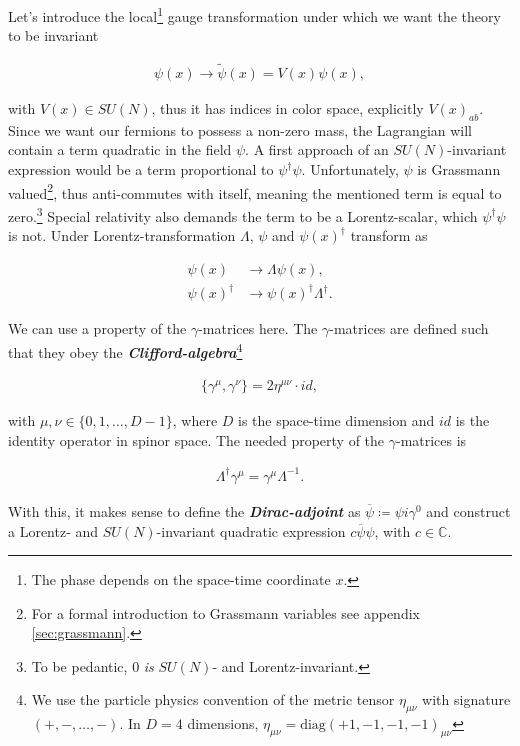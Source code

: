 \documentclass{article}
\theoremstyle{plain} %
\theoremstyle{convention} %
\theoremstyle{remark} %
\def\df#1{\textbf{\textit{#1}}}
\numberwithin{equation}{section}
\begin{document}
Let's introduce the local\footnote{The phase depends on the space-time coordinate $x$.} gauge transformation under which we want the theory to be invariant

\begin{align*}
    \psi(x) \longrightarrow \tilde{\psi}(x) = V(x) \psi(x),
\end{align*}

with $V(x) \in SU(N)$, thus it has indices in color space, explicitly $V(x)_{ab}$. Since we want our fermions to possess a non-zero mass, the Lagrangian will contain a term quadratic in the field $\psi$. A first approach of an $SU(N)$-invariant expression would be a term proportional to $\psi^{\dagger} \psi$. Unfortunately, $\psi$ is Grassmann valued\footnote{For a formal introduction to Grassmann variables see appendix \ref{sec:grassmann}.}, thus anti-commutes with itself, meaning the mentioned term is equal to zero.\footnote{To be pedantic, $0$ \textit{is} $SU(N)$- and Lorentz-invariant.} Special relativity also demands the term to be a Lorentz-scalar, which $\psi^{\dagger} \psi$ is not. Under Lorentz-transformation $\Lambda$, $\psi$ and $\psi(x)^{\dagger}$ transform as

\begin{align*}
    \psi(x) &\longrightarrow \Lambda \psi(x), \\
    \psi(x)^{\dagger} &\longrightarrow \psi(x)^{\dagger} \Lambda^{\dagger}.
\end{align*}

We can use a property of the $\gamma$-matrices here. The $\gamma$-matrices are defined such that they obey the \df{Clifford-algebra}\footnote{We use the particle physics convention of the metric tensor $\eta_{\mu \nu}$ with signature $(+,-,\dots,-)$. In $D=4$ dimensions, $\eta_{\mu \nu} = \mathrm{diag}(+1, -1, -1, -1)_{\mu \nu}$}

\begin{align}
    \{\gamma^{\mu}, \gamma^{\nu}\} = 2 \eta^{\mu \nu} \cdot id, \label{eq:cliff}
\end{align}

with $\mu,\nu \in \{0, 1, \dots, D-1\}$, where $D$ is the space-time dimension and $id$ is the identity operator in spinor space. The needed property of the $\gamma$-matrices is

\begin{align*}
    \Lambda^{\dagger} \gamma^{\mu} = \gamma^{\mu} \Lambda^{-1}.
\end{align*}

With this, it makes sense to define the \df{Dirac-adjoint} as $\overline{\psi} \coloneqq \psi i \gamma^0$ and construct a Lorentz- and $SU(N)$-invariant quadratic expression $c \overline{\psi} \psi$, with $c \in \mathbb{C}$.
\end{document}
